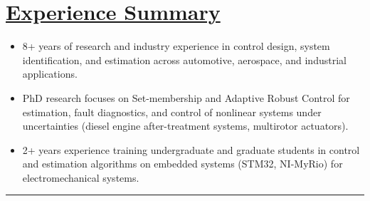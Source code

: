 \section*{\underline{Experience Summary}}
\begin{itemize}
        \item 8+ years of research and industry experience in control design, system identification, and estimation across automotive, aerospace, and industrial applications.
        \item PhD research focuses on Set-membership and Adaptive Robust Control for estimation, fault diagnostics, and control of nonlinear systems under uncertainties (diesel engine after-treatment systems, multirotor actuators).
        \item 2+ years experience training undergraduate and graduate students in control and estimation algorithms on embedded systems (STM32, NI-MyRio) for electromechanical systems.
\end{itemize}

\noindent\rule{\textwidth}{0.4pt}

